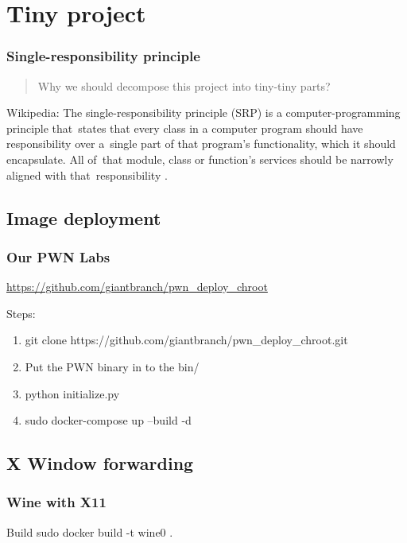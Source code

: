 \documentclass{beamer}
\begin{document}
\section{Tiny project}
\begin{frame}
    \frametitle{Single-responsibility principle}
    \begin{quote}
        Why we should decompose this project into tiny-tiny parts?
    \end{quote}

    \begin{block}{Wikipedia:}
        The single-responsibility principle (SRP) is a computer-programming principle that\
        states that every class in a computer program should have responsibility over a\
        single part of that program's functionality, which it should encapsulate. All of\
        that module, class or function's services should be narrowly aligned with that\
        responsibility \cite{SRP_wiki}.
    \end{block}
\end{frame}
\subsection{Image deployment}
\begin{frame}
    \frametitle{Our PWN Labs}
    \url{https://github.com/giantbranch/pwn_deploy_chroot}\\
    \begin{block}{Steps:}
        \begin{enumerate}
            \item git clone https://github.com/giantbranch/pwn\_deploy\_chroot.git
            \item Put the PWN binary in to the bin/
            \item python initialize.py
            \item sudo docker-compose up --build -d
        \end{enumerate}
    \end{block}

\end{frame}

\subsection{X Window forwarding}
\begin{frame}
    \frametitle{Wine with X11}
    
    \begin{block}{Build}
        sudo docker build -t wine0 .
    \end{block}
\end{frame}
\end{document}
